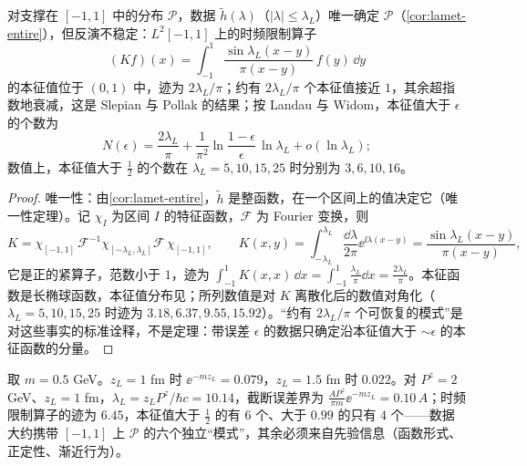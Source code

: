 \begin{proposition}\label{prop:lamet-slepian}
对支撑在 $[-1,1]$ 中的分布 $\mathcal P$，数据 $\tilde h(\lambda)$（$|\lambda|\le\lambda_L$）唯一确定 $\mathcal P$（\cref{cor:lamet-entire}），但反演不稳定：$L^2[-1,1]$ 上的时频限制算子
\[
(Kf)(x)=\int_{-1}^1\frac{\sin\lambda_L(x-y)}{\pi(x-y)}\,f(y)\,\dd y
\]
的本征值位于 $(0,1)$ 中，迹为 $2\lambda_L/\pi$；约有 $2\lambda_L/\pi$ 个本征值接近 $1$，其余超指数地衰减，这是 Slepian 与 Pollak 的结果\cite{SlepianPollak1961}；按 Landau 与 Widom\cite{LandauWidom1980}，本征值大于 $\epsilon$ 的个数为
\[
N(\epsilon)=\frac{2\lambda_L}\pi+\frac1{\pi^2}\ln\frac{1-\epsilon}\epsilon\,\ln\lambda_L+o(\ln\lambda_L);
\]
数值上，本征值大于 $\frac12$ 的个数在 $\lambda_L=5,10,15,25$ 时分别为 $3,6,10,16$。%
\end{proposition}

\begin{proof}
唯一性：由\cref{cor:lamet-entire}，$\tilde h$ 是整函数，在一个区间上的值决定它（唯一性定理）。记 $\chi_I$ 为区间 $I$ 的特征函数，$\mathcal F$ 为 Fourier 变换，则
\[
K=\chi_{[-1,1]}\,\mathcal F^{-1}\chi_{[-\lambda_L,\lambda_L]}\mathcal F\,\chi_{[-1,1]},\qquad K(x,y)=\int_{-\lambda_L}^{\lambda_L}\frac{\dd\lambda}{2\pi}\ee^{\ii\lambda(x-y)}=\frac{\sin\lambda_L(x-y)}{\pi(x-y)},
\]
它是正的紧算子，范数小于 $1$，迹为 $\int_{-1}^1K(x,x)\,\dd x=\int_{-1}^1\frac{\lambda_L}\pi\dd x=\frac{2\lambda_L}\pi$。本征函数是长椭球函数，本征值分布见\cite{SlepianPollak1961,LandauWidom1980}；所列数值是对 $K$ 离散化后的数值对角化（$\lambda_L=5,10,15,25$ 时迹为 $3.18,6.37,9.55,15.92$）。“约有 $2\lambda_L/\pi$ 个可恢复的模式”是对这些事实的标准诠释，不是定理：带误差 $\epsilon$ 的数据只确定沿本征值大于 $\sim\epsilon$ 的本征函数的分量。
\end{proof}

\begin{example}[截断误差与可恢复模式数的数值]\label{ex:lamet-fourier-numbers}
取 $m=0.5$ GeV。$z_L=1$ fm 时 $\ee^{-mz_L}=0.079$，$z_L=1.5$ fm 时 $0.022$。对 $P^z=2$ GeV、$z_L=1$ fm，$\lambda_L=z_LP^z/\hbar c=10.14$，截断误差界为 $\frac{AP^z}{\pi m}\ee^{-mz_L}=0.10\,A$；时频限制算子的迹为 $6.45$，本征值大于 $\frac12$ 的有 $6$ 个、大于 $0.99$ 的只有 $4$ 个——数据大约携带 $[-1,1]$ 上 $\mathcal P$ 的六个独立“模式”，其余必须来自先验信息（函数形式、正定性、渐近行为）。
\end{example}

